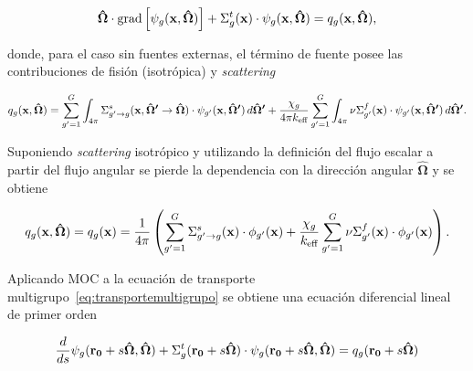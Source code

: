 \documentclass[11pt]{article}
\renewcommand{\vec}[1]{\ensuremath\mathbf{#1}}
\begin{document}
\begin{equation}
 \label{eq:transportemultigrupo}
 \boldsymbol{\hat{\Omega}} \cdot \text{grad} \left[ \psi_g(\vec{x}, \boldsymbol{\hat{\Omega}}) \right]
 + \Sigma^t_g(\vec{x}) \cdot \psi_g(\vec{x}, \boldsymbol{\hat{\Omega}}) = q_g(\vec{x}, \boldsymbol{\hat{\Omega}}),
\end{equation}

\noindent
donde, para el caso sin fuentes externas, el término de fuente posee las contribuciones de fisión (isotrópica) y \emph{scattering}

\begin{equation} \label{eq:fuentemultigrupo-1}
 q_g(\vec{x}, \boldsymbol{\hat{\Omega}}) =
 \sum_{g^\prime=1}^G \int_{4\pi} \Sigma^s_{g^\prime \rightarrow g}(\vec{x}, \boldsymbol{\hat{\Omega}^\prime} \rightarrow \boldsymbol{\hat{\Omega}}) \cdot \psi_{g^\prime}(\vec{x}, \boldsymbol{\hat{\Omega}^\prime}) \, d\boldsymbol{\hat{\Omega}^\prime} 
 + \frac{\chi_g}{4\pi k_{\text{eff}}} \sum_{g^\prime=1}^G \int_{4\pi} \nu\Sigma^f_{g^\prime}(\vec{x}) \cdot \psi_{g^\prime}(\vec{x}, \boldsymbol{\hat{\Omega}^\prime}) \, d\boldsymbol{\hat{\Omega}^\prime}.
\end{equation}

\noindent
Suponiendo \emph{scattering} isotrópico y utilizando la definición del flujo escalar a partir del flujo angular se pierde la dependencia con la dirección angular $\boldsymbol{\hat{\Omega}}$ y se obtiene

\begin{equation} \label{eq:fuentemultigrupo-2}
 q_g(\vec{x}, \boldsymbol{\hat{\Omega}}) = 
 q_g(\vec{x}) = 
 \frac{1}{4\pi} \left(
 \sum_{g^\prime=1}^G \Sigma^s_{g^\prime \rightarrow g}(\vec{x}) \cdot \phi_{g^\prime}(\vec{x})
 + \frac{\chi_g}{k_{\text{eff}}} \sum_{g^\prime=1}^G \nu\Sigma^f_{g^\prime}(\vec{x}) \cdot \phi_{g^\prime}(\vec{x}) 
 \right).
\end{equation}

Aplicando MOC a la ecuación de transporte multigrupo~\eqref{eq:transportemultigrupo} se obtiene una ecuación diferencial lineal de primer orden~\cite{glasstone,handbook-ingnuclear}

\begin{equation} \label{eq:caracteristica}
 \frac{d}{ds}\psi_g(\vec{r_0}+s\boldsymbol{\hat{\Omega}},\boldsymbol{\hat{\Omega}}) 
 + \Sigma^t_g(\vec{r_0}+s\boldsymbol{\hat{\Omega}}) \cdot \psi_g(\vec{r_0}+s\boldsymbol{\hat{\Omega}}, \boldsymbol{\hat{\Omega}}) = 
 q_g(\vec{r_0}+s\boldsymbol{\hat{\Omega}})
\end{equation}
\end{document}
